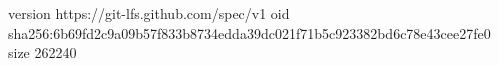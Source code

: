 version https://git-lfs.github.com/spec/v1
oid sha256:6b69fd2c9a09b57f833b8734edda39dc021f71b5c923382bd6c78e43cee27fe0
size 262240
